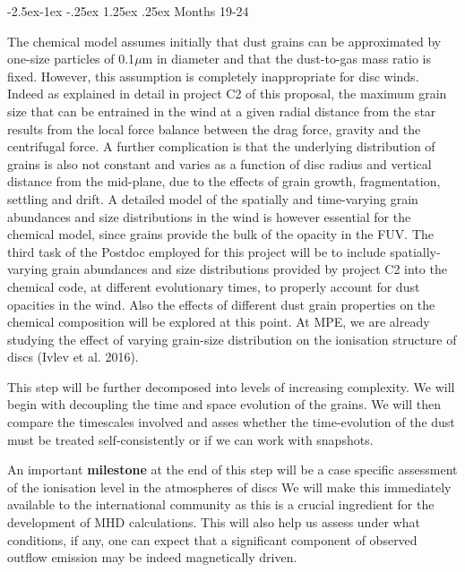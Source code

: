 \documentclass[10pt,fleqn,twoside]{article}
\makeatletter
\newcommand{\Tcol}{\color{blue}}
\renewcommand\paragraph{\@startsection{paragraph}{4}{\z@}%
            {-2.5ex\@plus -1ex \@minus -.25ex}%
            {1.25ex \@plus .25ex}%
            {\normalfont\normalsize\bfseries}}
\makeatother
\begin{document}
\paragraph{\Tcol  Months 19-24}

\noindent {\Tcol\bf Dust evolution.} The chemical model assumes initially that dust grains can be approximated by one-size particles of 0.1${\mu}$m in diameter and that the dust-to-gas mass ratio is fixed.  However, this assumption is completely inappropriate for disc winds. Indeed as explained in detail in project C2 of this proposal, the maximum grain size that can be entrained in the wind at a given radial distance from the star results from the local force balance between the drag force, gravity and the centrifugal force. A further complication is that the underlying distribution of grains is also not constant and varies as a function of disc radius and vertical distance from the mid-plane, due to the effects of grain growth, fragmentation, settling and drift. A detailed model of the spatially and time-varying grain abundances and size distributions in the wind is however essential for the chemical model, since grains provide the bulk of the opacity in the FUV. The third task of the Postdoc employed for this project will be to include spatially-varying grain abundances and size distributions
provided by project C2 into the chemical code, at different evolutionary times, to properly account for dust opacities in the wind.  Also the effects of different dust grain properties on the chemical composition will be explored at this point.  At MPE, we are already studying the effect of varying grain-size distribution on the ionisation structure of discs (Ivlev et al. 2016). 

This step will be further decomposed into levels of increasing complexity. We will begin with decoupling the time and space evolution of the grains. We will then compare the timescales involved and asses whether the time-evolution of the dust must be treated self-consistently or if we can work with snapshots. 

An important {\bf milestone} at the end of this step will be a case specific assessment of the ionisation level in the atmospheres of discs We will make this immediately available to the international community as this is a crucial ingredient for the development of MHD calculations. This will also help us assess under what conditions, if any, one can expect that a significant component of observed outflow emission may be indeed magnetically driven. 
\end{document}
